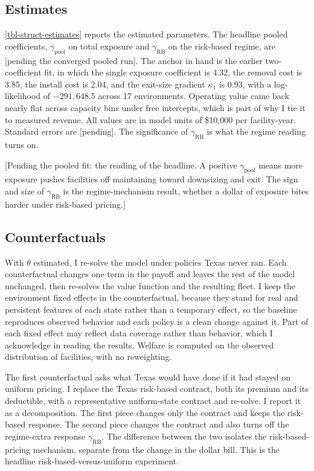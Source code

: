 \documentclass[
  12pt,
]{article}
\begin{document}
\subsection{Estimates}\label{estimates}

\autoref{tbl-struct-estimates} reports the estimated parameters. The
headline pooled coefficients, \(\gamma_{\text{pool}}\) on total exposure
and \(\gamma_{\text{RB}}\) on the risk-based regime, are {[}pending the
converged pooled run{]}. The anchor in hand is the earlier
two-coefficient fit, in which the single exposure coefficient is 4.32,
the removal cost is 3.85, the install cost is 2.04, and the exit-size
gradient \(\kappa_1\) is 0.93, with a log-likelihood of \(-291{,}648.5\)
across 17 environments. Operating value came back nearly flat across
capacity bins under free intercepts, which is part of why I tie it to
measured revenue. All values are in model units of \$10,000 per
facility-year. Standard errors are {[}pending{]}. The significance of
\(\gamma_{\text{RB}}\) is what the regime reading turns on.

{[}Pending the pooled fit: the reading of the headline. A positive
\(\gamma_{\text{pool}}\) means more exposure pushes facilities off
maintaining toward downsizing and exit. The sign and size of
\(\gamma_{\text{RB}}\) is the regime-mechanism result, whether a dollar
of exposure bites harder under risk-based pricing.{]}

\subsection{Counterfactuals}\label{counterfactuals}

With \(\theta\) estimated, I re-solve the model under policies Texas
never ran. Each counterfactual changes one term in the payoff and leaves
the rest of the model unchanged, then re-solves the value function and
the resulting fleet. I keep the environment fixed effects in the
counterfactual, because they stand for real and persistent features of
each state rather than a temporary effect, so the baseline reproduces
observed behavior and each policy is a clean change against it. Part of
each fixed effect may reflect data coverage rather than behavior, which
I acknowledge in reading the results. Welfare is computed on the
observed distribution of facilities, with no reweighting.

The first counterfactual asks what Texas would have done if it had
stayed on uniform pricing. I replace the Texas risk-based contract, both
its premium and its deductible, with a representative uniform-state
contract and re-solve. I report it as a decomposition. The first piece
changes only the contract and keeps the risk-based response. The second
piece changes the contract and also turns off the regime-extra response
\(\gamma_{\text{RB}}\). The difference between the two isolates the
risk-based-pricing mechanism, separate from the change in the dollar
bill. This is the headline risk-based-versus-uniform experiment.
\end{document}
